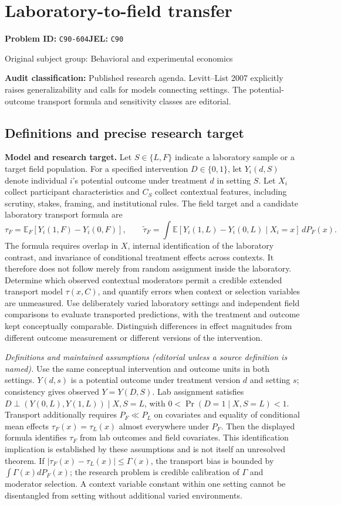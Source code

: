 \documentclass[11pt,a4paper]{article}
\begin{document}
\section*{Laboratory-to-field transfer}
\textbf{Problem ID:} \texttt{C90-604}\quad \textbf{JEL:} \texttt{C90}\par
\label{problem:OP-0306}
{\sffamily\small\color{muted}Original subject group: Behavioral and experimental economics\par}
\label{definitions:problem:30007588}
\textbf{Audit classification:} Published research agenda. Levitt–List 2007 explicitly raises generalizability and calls for models connecting settings. The potential-outcome transport formula and sensitivity classes are editorial.
\subsection*{Definitions and precise research target}
\textbf{Model and research target.} Let \(S\in\{L,F\}\) indicate a laboratory sample or a target field population. For a specified intervention \(D\in\{0,1\}\), let \(Y_i(d,S)\) denote individual \(i\)'s potential outcome under treatment \(d\) in setting \(S\). Let \(X_i\) collect participant characteristics and \(C_S\) collect contextual features, including scrutiny, stakes, framing, and institutional rules. The field target and a candidate laboratory transport formula are
\[\tau_F=\mathbb E_F[Y_i(1,F)-Y_i(0,F)],\qquad \widetilde\tau_F=\int\mathbb E[Y_i(1,L)-Y_i(0,L)\mid X_i=x]\,dP_F(x).\]
The formula requires overlap in \(X\), internal identification of the laboratory contrast, and invariance of conditional treatment effects across contexts. It therefore does not follow merely from random assignment inside the laboratory. Determine which observed contextual moderators permit a credible extended transport model \(\tau(x,C)\), and quantify errors when context or selection variables are unmeasured. Use deliberately varied laboratory settings and independent field comparisons to evaluate transported predictions, with the treatment and outcome kept conceptually comparable. Distinguish differences in effect magnitudes from different outcome measurement or different versions of the intervention.

\emph{Definitions and maintained assumptions (editorial unless a source definition is named).} Use the same conceptual intervention and outcome units in both settings. \(Y(d,s)\) is a potential outcome under treatment version \(d\) and setting \(s\); consistency gives observed \(Y=Y(D,S)\). Lab assignment satisfies \(D\perp(Y(0,L),Y(1,L))\mid X,S=L\), with \(0<\Pr(D=1\mid X,S=L)<1\). Transport additionally requires \(P_F\ll P_L\) on covariates and equality of conditional mean effects \(\tau_F(x)=\tau_L(x)\) almost everywhere under \(P_F\). Then the displayed formula identifies \(\tau_F\) from lab outcomes and field covariates. This identification implication is established by these assumptions and is not itself an unresolved theorem. If \(|\tau_F(x)-\tau_L(x)|\le\Gamma(x)\), the transport bias is bounded by \(\int\Gamma(x)dP_F(x)\); the research problem is credible calibration of \(\Gamma\) and moderator selection. A context variable constant within one setting cannot be disentangled from setting without additional varied environments.
\end{document}
